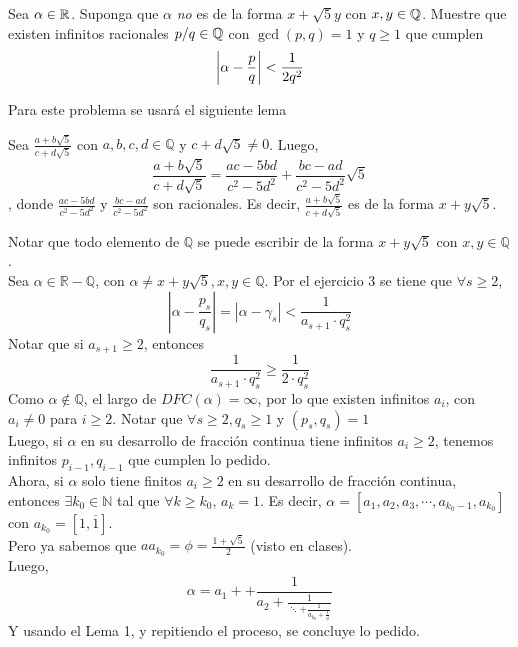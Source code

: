 \begin{prob}[5 pts.]
	Sea $\alpha\in\mathbb{R}$. Suponga que $\alpha$ \textit{no} es de la forma $x+\sqrt{5}y$ con $x,y\in\mathbb{Q}$. Muestre que existen infinitos racionales $p/q\in\mathbb{Q}$ con $\gcd(p,q)=1$ y $q\geq 1$ que cumplen
	\[
		\left|\alpha-\frac{p}{q}\right|<\frac1{2q^2}
	\]
\end{prob}

\begin{sol}
	Para este problema se usará el siguiente lema
	\begin{lem}
		Sea $\frac{a + b\sqrt{5}}{c + d\sqrt{5}}$ con $a, b, c, d \in \mathbb{Q}$ y $c + d\sqrt{5} \not= 0$. Luego,
		\begin{equation*}
			\frac{a + b\sqrt{5}}{c + d\sqrt{5}} = \frac{ac - 5bd}{c^2 - 5d^2} + \frac{bc - ad}{c^2 - 5d^2} \sqrt{5}
		\end{equation*}
		, donde $\frac{ac - 5bd}{c^2 - 5d^2}$ y $\frac{bc - ad}{c^2 - 5d^2}$ son racionales. Es decir, $\frac{a + b\sqrt{5}}{c + d\sqrt{5}}$ es de la forma $x + y\sqrt{5}$.
	\end{lem}

	Notar que todo elemento de $\mathbb{Q}$ se puede escribir de la forma $x + y \sqrt{5}$ con $x, y \in \mathbb{Q}$. \\
	Sea $\alpha \in \mathbb{R} - \mathbb{Q}$, con $\alpha \not= x + y \sqrt{5}, x, y \in \mathbb{Q}$. Por el ejercicio 3 se tiene que $\forall s \geq 2$,
	$$\left | \alpha - \frac{p_s}{q_s} \right | = | \alpha - \gamma_s| < \frac{1}{a_{s+1} \cdot q_s^2}$$
	Notar que si $a_{s+1} \geq 2$, entonces
	$$\frac{1}{a_{s+1} \cdot q_s^2} \geq \frac{1}{2 \cdot q_s^2}$$
	Como $\alpha \not\in \mathbb{Q}$, el largo de $DFC(\alpha) = \infty$, por lo que existen infinitos $a_i$, con $a_i \not= 0$ para $i \geq 2$. Notar que $\forall s \geq 2, q_s \geq 1$ y $(p_s, q_s) = 1$ \\
	Luego, si $\alpha$ en su desarrollo de fracción continua tiene infinitos $a_i \geq 2$, tenemos infinitos $p_{i-1}, q_{i-1}$ que cumplen lo pedido. \\
	Ahora, si $\alpha$ solo tiene finitos $a_i \geq 2$ en su desarrollo de fracción continua, entonces $\exists k_0 \in \mathbb{N}$ tal que $\forall k \geq k_0$, $a_k = 1$. Es decir, $\alpha = [a_1, a_2, a_3, \cdots, a_{k_0 - 1}, a_{k_0}]$ con $a_{k_0} = [1, \overline{1}]$. \\
	Pero ya sabemos que $aa_{k_0} = \phi = \frac{1 + \sqrt{5}}{2}$ (visto en clases). \\
	Luego,
	$$\alpha = a_1 + + \frac{1}{a_2 + \frac{1}{\ddots + \frac{1}{a_{k_0} + \frac{1}{\phi}}}}$$
	Y usando el Lema 1, y repitiendo el proceso, se concluye lo pedido.
\end{sol}

